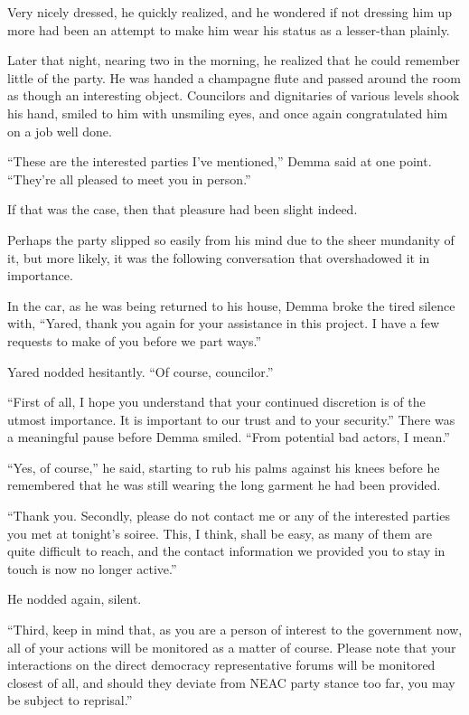 Very nicely dressed, he quickly realized, and he wondered if not dressing him up more had been an attempt to make him wear his status as a lesser-than plainly.

Later that night, nearing two in the morning, he realized that he could remember little of the party. He was handed a champagne flute and passed around the room as though an interesting object. Councilors and dignitaries of various levels shook his hand, smiled to him with unsmiling eyes, and once again congratulated him on a job well done.

``These are the interested parties I've mentioned,'' Demma said at one point. ``They're all pleased to meet you in person.''

If that was the case, then that pleasure had been slight indeed.

Perhaps the party slipped so easily from his mind due to the sheer mundanity of it, but more likely, it was the following conversation that overshadowed it in importance.

In the car, as he was being returned to his house, Demma broke the tired silence with, ``Yared, thank you again for your assistance in this project. I have a few requests to make of you before we part ways.''

Yared nodded hesitantly. ``Of course, councilor.''

``First of all, I hope you understand that your continued discretion is of the utmost importance. It is important to our trust and to your security.'' There was a meaningful pause before Demma smiled. ``From potential bad actors, I mean.''

``Yes, of course,'' he said, starting to rub his palms against his knees before he remembered that he was still wearing the long garment he had been provided.

``Thank you. Secondly, please do not contact me or any of the interested parties you met at tonight's soiree. This, I think, shall be easy, as many of them are quite difficult to reach, and the contact information we provided you to stay in touch is now no longer active.''

He nodded again, silent.

``Third, keep in mind that, as you are a person of interest to the government now, all of your actions will be monitored as a matter of course. Please note that your interactions on the direct democracy representative forums will be monitored closest of all, and should they deviate from NEAC party stance too far, you may be subject to reprisal.''

